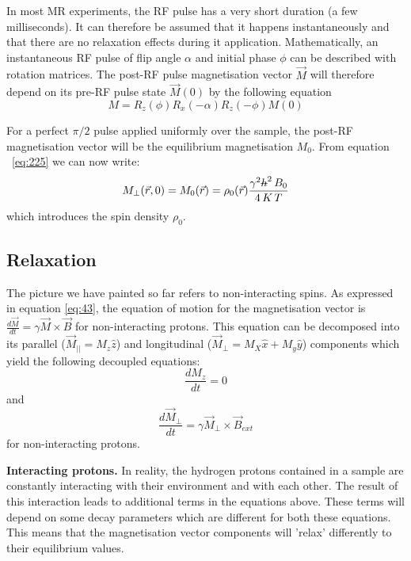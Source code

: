 \hfill

In most MR experiments, the RF pulse has a very short duration (a few milliseconds).
It can therefore be assumed that it happens instantaneously and that there are no relaxation effects during it application.
Mathematically, an instantaneous RF pulse of flip angle $\alpha$ and initial phase $\phi$ can be described with rotation matrices.
The post-RF pulse magnetisation vector $\vec{M}$ will therefore depend on its pre-RF pulse state $\vec{M}(0)$ by the following equation
\begin{equation} \label{eq:445}
    M = R_z(\phi) R_x(-\alpha) R_z(-\phi) M(0)
\end{equation}

For a perfect $\pi/2$ pulse applied uniformly over the sample, the post-RF magnetisation vector will be the equilibrium magnetisation $M_0$. 
From equation ~\ref{eq:225} we can now write:
\begin{equation}\label{eq:93}
    M_{\perp}(\vec{r},0) = M_0(\vec{r}) = \rho_0(\vec{r}) \frac{\gamma^2 \text{\sout{$h$}}^2 \, B_0}{4 \, K \, T}
\end{equation}
which introduces the spin density $\rho_0$.

\hfill

\subsection{Relaxation} \label{app:relaxation}

The picture we have painted so far refers to non-interacting spins.
As expressed in equation \ref{eq:43}, the equation of motion for the magnetisation vector is $\frac{d\vec{M}}{dt} = \gamma \vec{M} \times \vec{B}$  for non-interacting protons. 
This equation can be decomposed into its parallel ($\vec{M}_{||} = M_z \hat{z}$) and longitudinal ($\vec{M}_{\perp} = M_X \hat{x} + M_y \hat{y}$) components which yield the following decoupled equations:
\begin{equation}\label{eq:46}
    \frac{d M_z}{dt} = 0
\end{equation}
and 
\begin{equation}\label{eq:47}
    \frac{d \vec{M}_{\perp}}{dt} = \gamma \vec{M}_{\perp} \times \vec{B}_{ext}
\end{equation}
for non-interacting protons.

\hfill

\textbf{Interacting protons.} In reality, the hydrogen protons contained in a sample are constantly interacting with their environment and with each other.
The result of this interaction leads to additional terms in the equations above.
These terms will depend on some decay parameters which are different for both these equations.
This means that the magnetisation vector components will 'relax' differently to their equilibrium values.

